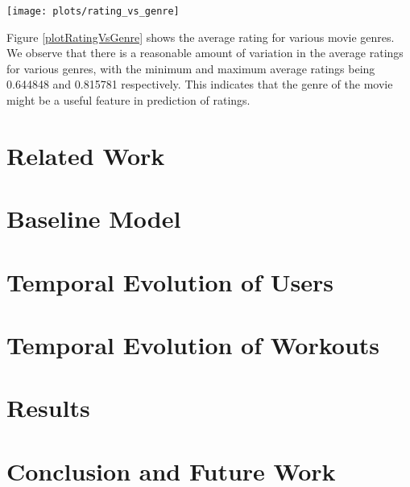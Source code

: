 \documentclass{acm_proc_article-sp}
\begin{document}
\begin{figure*}
\centering
\texttt{[image: plots/rating\_vs\_genre]}
\caption{\label{plotRatingVsGenre} Average rating for various movie genres}
\end{figure*}

Figure \ref{plotRatingVsGenre} shows the average rating for various movie genres. We observe that there is a reasonable amount of variation in the average ratings for various genres, with the minimum and maximum average ratings being 0.644848 and 0.815781 respectively. This indicates that the genre of the movie might be a useful feature in prediction of ratings.

\section{Related Work}

\section{Baseline Model}
\label{secBaselineModel}

\section{Temporal Evolution of Users}
\label{secTemporalModelUsers}

\section{Temporal Evolution of Workouts}
\label{secTemporalModelWorkouts}

\section{Results}

\begin{comment}
\begin{table*}
\centering
\begin{tabular}{|c|c|c|c|c|c|c|} \hline
& \# Examples & Variance & Linear Predictor & Collaborative Filtering & Latent Factor & Mahout ALS \\ \hline
Training & 640135 & 0.049970 & 0.029748 {\bf(0.404688)} & 0.023681 {\bf(0.526092)} & 0.020354 {\bf(0.592680)} & {\bf(0.586866)} \\ \hline
Validation & 160033 & 0.049826 & 0.033429 {\bf(0.329085)}  & 0.033488 {\bf(0.327886)} & 0.030545 {\bf(0.386954)} & {\bf(0.392062)} \\ \hline
Test & 200041 & 0.049818 & 0.033776 {\bf(0.322010)} & 0.033779 {\bf(0.321948)} & 0.030765 {\bf(0.382451)} & {\bf(0.388799)}\\ \hline
\end{tabular}
\caption{MSE and $R^2$ obtained using the 3 predictors discussed in this work and Mahout's ALS recommender on the MovieLens dataset. Values in boldface/brackets are $R^2$ values.}
\label{tableResults}
\end{table*}
\end{comment}

\section{Conclusion and Future Work}



\end{document}
